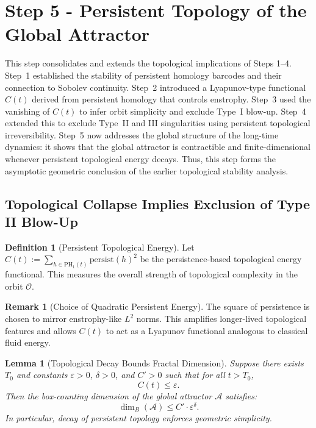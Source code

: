 \documentclass[11pt]{article}
\newtheorem{lemma}[theorem]{Lemma}
\theoremstyle{definition}
\newtheorem{definition}[theorem]{Definition}
\newtheorem{remark}[theorem]{Remark}
\begin{document}
\section{Step 5 - Persistent Topology of the Global Attractor}
\label{sec:step5}

This step consolidates and extends the topological implications of Steps 1--4. Step~1 established the stability of persistent homology barcodes and their connection to Sobolev continuity. Step~2 introduced a Lyapunov-type functional $C(t)$ derived from persistent homology that controls enstrophy. Step~3 used the vanishing of $C(t)$ to infer orbit simplicity and exclude Type~I blow-up. Step~4 extended this to exclude Type~II and III singularities using persistent topological irreversibility. Step~5 now addresses the global structure of the long-time dynamics: it shows that the global attractor is contractible and finite-dimensional whenever persistent topological energy decays. Thus, this step forms the asymptotic geometric conclusion of the earlier topological stability analysis.

\subsection{Topological Collapse Implies Exclusion of Type II Blow-Up}

\begin{definition}[Persistent Topological Energy]
Let $C(t) := \sum_{h \in \mathrm{PH}_1(t)} \mathrm{persist}(h)^2$ be the persistence-based topological energy functional. This measures the overall strength of topological complexity in the orbit $\mathcal{O}$.
\end{definition}

\begin{remark}[Choice of Quadratic Persistent Energy]
The square of persistence is chosen to mirror enstrophy-like $L^2$ norms. This amplifies longer-lived topological features and allows $C(t)$ to act as a Lyapunov functional analogous to classical fluid energy.
\end{remark}

\begin{lemma}[Topological Decay Bounds Fractal Dimension]
\label{lem:fractal-dim-bound}
Suppose there exists $T_0$ and constants $\varepsilon > 0$, $\delta > 0$, and $C' > 0$ such that for all $t > T_0$,
\[
C(t) \le \varepsilon.
\]
Then the box-counting dimension of the global attractor $\mathcal{A}$ satisfies:
\[
\dim_B(\mathcal{A}) \le C' \cdot \varepsilon^{\delta}.
\]
In particular, decay of persistent topology enforces geometric simplicity.
\end{lemma}
\end{document}

